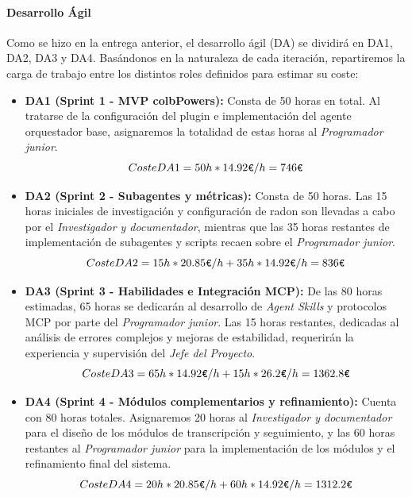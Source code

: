 \documentclass[11pt, letterpaper]{article}
\begin{document}
\paragraph{Desarrollo Ágil}
\label{sec:coste_da}
Como se hizo en la entrega anterior, el desarrollo ágil (DA) se dividirá en DA1, DA2, DA3 y DA4. Basándonos en la naturaleza de cada iteración, repartiremos la carga de trabajo entre los distintos roles definidos para estimar su coste:

\begin{itemize}
    \item \textbf{DA1 (Sprint 1 - MVP colbPowers):} Consta de 50 horas en total. Al tratarse de la configuración del plugin e implementación del agente orquestador base, asignaremos la totalidad de estas horas al \textit{Programador junior}.
    \begin{equation*}
        Coste DA1 = 50h * 14{.}92\verb|€|/h = 746\verb|€|
    \end{equation*}
    
    \item \textbf{DA2 (Sprint 2 - Subagentes y métricas):} Consta de 50 horas. Las 15 horas iniciales de investigación y configuración de radon son llevadas a cabo por el \textit{Investigador y documentador}, mientras que las 35 horas restantes de implementación de subagentes y scripts recaen sobre el \textit{Programador junior}.
    \begin{equation*}
        Coste DA2 = 15h * 20{.}85\verb|€|/h + 35h * 14{.}92\verb|€|/h = 836\verb|€|
    \end{equation*}
    
    \item \textbf{DA3 (Sprint 3 - Habilidades e Integración MCP):} De las 80 horas estimadas, 65 horas se dedicarán al desarrollo de \textit{Agent Skills} y protocolos MCP por parte del \textit{Programador junior}. Las 15 horas restantes, dedicadas al análisis de errores complejos y mejoras de estabilidad, requerirán la experiencia y supervisión del \textit{Jefe del Proyecto}.
    \begin{equation*}
        Coste DA3 = 65h * 14{.}92\verb|€|/h + 15h * 26{.}2\verb|€|/h = 1362{.}8\verb|€|
    \end{equation*}
    
    \item \textbf{DA4 (Sprint 4 - Módulos complementarios y refinamiento):} Cuenta con 80 horas totales. Asignaremos 20 horas al \textit{Investigador y documentador} para el diseño de los módulos de transcripción y seguimiento, y las 60 horas restantes al \textit{Programador junior} para la implementación de los módulos y el refinamiento final del sistema.
    \begin{equation*}
        Coste DA4 = 20h * 20{.}85\verb|€|/h + 60h * 14{.}92\verb|€|/h = 1312{.}2\verb|€|
    \end{equation*}
\end{itemize}
\end{document}
